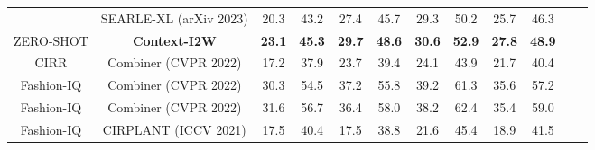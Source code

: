 \documentclass[letterpaper]{article} \usepackage{aaai24}  \usepackage{times}  \usepackage{helvet}  \usepackage{courier}  \usepackage[hyphens]{url}  \usepackage{graphicx} \urlstyle{rm} \def\UrlFont{\rm}  \usepackage{natbib}  \usepackage{caption} \frenchspacing  \setlength{\pdfpagewidth}{8.5in} \setlength{\pdfpageheight}{11in} \usepackage{algorithm}
\begin{document}
\begin{table*}[t]
{\begin{tabular}{cccccccccccc}
                            & SEARLE-XL (arXiv 2023)                                               & 20.3                                 & \multicolumn{1}{c|}{43.2}                        & 27.4                                 & \multicolumn{1}{c|}{45.7}                        & 29.3                                 & \multicolumn{1}{c|}{50.2}                        & 25.7                        & 46.3                        \\
                            \multirow{-6}{*}{ZERO-SHOT} & \textbf{Context-I2W}                                             & \textbf{23.1}                        & \multicolumn{1}{c|}{\textbf{45.3}}               & \textbf{29.7}                        & \multicolumn{1}{c|}{\textbf{48.6}}               & \textbf{30.6}                        & \multicolumn{1}{c|}{\textbf{52.9}}               & \textbf{27.8}               & \textbf{48.9}               \\ \cmidrule(lr){1-10}
CIRR                        & Combiner (CVPR 2022)                                                & 17.2                                 & \multicolumn{1}{c|}{37.9}                        & 23.7                        & \multicolumn{1}{c|}{39.4}                        & 24.1                                 & \multicolumn{1}{c|}{43.9}                        & 21.7                        & 40.4                        \\
Fashion-IQ                  & Combiner (CVPR 2022)                                                & 30.3                                 & \multicolumn{1}{c|}{54.5}                        & 37.2                        & \multicolumn{1}{c|}{55.8}                        & 39.2                                 & \multicolumn{1}{c|}{61.3}                        & 35.6                        & 57.2                        \\ Fashion-IQ                  & Combiner  (CVPR 2022)                                               & 31.6                                 & \multicolumn{1}{c|}{56.7}                        & 36.4                        & \multicolumn{1}{c|}{58.0}                        & 38.2                                 & \multicolumn{1}{c|}{62.4}                        & 35.4                        & 59.0                        \\
Fashion-IQ                  & CIRPLANT (ICCV 2021)                                              & 17.5                                 & \multicolumn{1}{c|}{40.4}                        & 17.5                        & \multicolumn{1}{c|}{38.8}                        & 21.6                                 & \multicolumn{1}{c|}{45.4}                        & 18.9                        & 41.5                        \\

\end{tabular}}
\end{table*}
\end{document}
